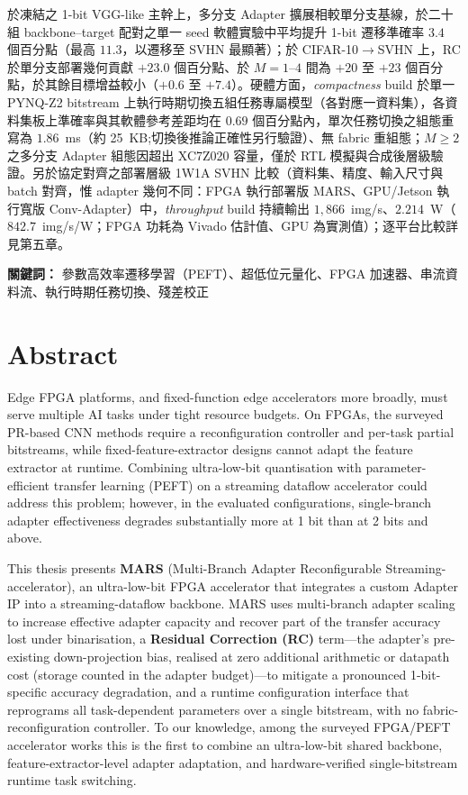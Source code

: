 \documentclass[12pt, a4paper]{report}
\numberwithin{equation}{chapter}
\numberwithin{figure}{chapter}
\numberwithin{table}{chapter}
\numberwithin{algorithm}{chapter}
\begin{document}
於凍結之 1-bit VGG-like 主幹上，多分支 Adapter 擴展相較單分支基線，於二十組 backbone--target 配對之單一 seed 軟體實驗中平均提升 1-bit 遷移準確率 $3.4$ 個百分點（最高 $11.3$，以遷移至 SVHN 最顯著）；於 CIFAR-10$\to$SVHN 上，RC 於單分支部署幾何貢獻 $+23.0$ 個百分點、於 $M{=}1$--$4$ 間為 $+20$ 至 $+23$ 個百分點，於其餘目標增益較小（$+0.6$ 至 $+7.4$）。硬體方面，\emph{compactness} build 於單一 PYNQ-Z2 bitstream 上執行時期切換五組任務專屬模型（各對應一資料集），各資料集板上準確率與其軟體參考差距均在 $0.69$ 個百分點內，單次任務切換之組態重寫為 $1.86$~ms（約 25~KB;切換後推論正確性另行驗證）、無 fabric 重組態；$M{\geq}2$ 之多分支 Adapter 組態因超出 XC7Z020 容量，僅於 RTL 模擬與合成後層級驗證。另於協定對齊之部署層級 1W1A SVHN 比較（資料集、精度、輸入尺寸與 batch 對齊，惟 adapter 幾何不同：FPGA 執行部署版 MARS、GPU/Jetson 執行寬版 Conv-Adapter）中，\emph{throughput} build 持續輸出 $1{,}866$~img/s、$2.214$~W（$842.7$~img/s/W；FPGA 功耗為 Vivado 估計值、GPU 為實測值）；逐平台比較詳見第五章。

\vspace{1em}
\enlargethispage{2\baselineskip}
\noindent \textbf{關鍵詞：} 參數高效率遷移學習（PEFT）、超低位元量化、FPGA 加速器、串流資料流、執行時期任務切換、殘差校正

\clearpage
\section*{\centering Abstract}
Edge FPGA platforms, and fixed-function edge accelerators more broadly, must serve multiple AI tasks under tight resource budgets. On FPGAs, the surveyed PR-based CNN methods require a reconfiguration controller and per-task partial bitstreams, while fixed-feature-extractor designs cannot adapt the feature extractor at runtime. Combining ultra-low-bit quantisation with parameter-efficient transfer learning (PEFT) on a streaming dataflow accelerator could address this problem; however, in the evaluated configurations, single-branch adapter effectiveness degrades substantially more at 1 bit than at 2 bits and above.

This thesis presents \textbf{MARS} (Multi-Branch Adapter Reconfigurable Streaming-accelerator), an ultra-low-bit FPGA accelerator that integrates a custom Adapter IP into a streaming-dataflow backbone. MARS uses multi-branch adapter scaling to increase effective adapter capacity and recover part of the transfer accuracy lost under binarisation, a \textbf{Residual Correction (RC)} term---the adapter's pre-existing down-projection bias, realised at zero additional arithmetic or datapath cost (storage counted in the adapter budget)---to mitigate a pronounced 1-bit-specific accuracy degradation, and a runtime configuration interface that reprograms all task-dependent parameters over a single bitstream, with no fabric-reconfiguration controller. To our knowledge, among the surveyed FPGA/PEFT accelerator works this is the first to combine an ultra-low-bit shared backbone, feature-extractor-level adapter adaptation, and hardware-verified single-bitstream runtime task switching.
\end{document}
